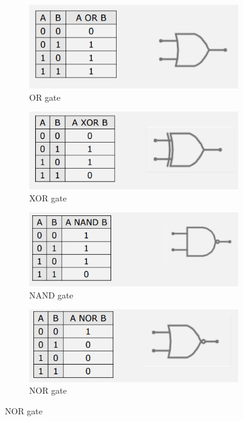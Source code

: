 \documentclass{article}
\begin{document}
\begin{figure}[h]
    \centering
    \begin{subfigure}{.49\textwidth}
        \centering
        \includegraphics[width=\linewidth]{IM_OR.PNG}
        \caption{OR gate}
        \label{OR}
    \end{subfigure}
    \hfill
    \begin{subfigure}{.49\textwidth}
        \centering
        \includegraphics[width=\linewidth]{IM_XOR.PNG}
        \caption{XOR gate}
        \label{XOR}        
    \end{subfigure}
    
    \centering
    \begin{subfigure}{.49\textwidth}
        \centering
        \includegraphics[width=\linewidth]{IM_NAND.PNG}
        \caption{NAND gate}
        \label{NAND}
    \end{subfigure}
    \hfill
    \begin{subfigure}{.49\textwidth}
        \centering
        \includegraphics[width=\linewidth]{IM_NOR.PNG}
        \caption{NOR gate}
        \label{NOR}        
    \end{subfigure}
    

\end{figure}
\end{document}
